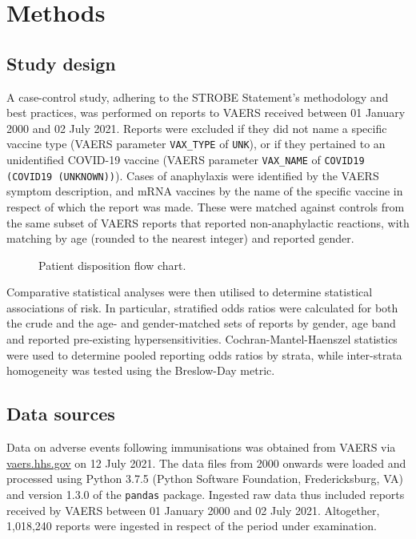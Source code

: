 \documentclass{article}
\begin{document}
\section{Methods}

\subsection{Study design}

A case-control study, adhering to the STROBE Statement's methodology and best practices,\cite{von2014strengthening} was performed on reports to VAERS received between 01 January 2000 and 02 July 2021.
Reports were excluded if they did not name a specific vaccine type (VAERS parameter \texttt{VAX\_TYPE} of \texttt{UNK}), or if they pertained to an unidentified COVID-19 vaccine (VAERS parameter \texttt{VAX\_NAME} of \texttt{COVID19 (COVID19 (UNKNOWN))}).
Cases of anaphylaxis were identified by the VAERS symptom description, and mRNA vaccines by the name of the specific vaccine in respect of which the report was made.
These were matched against controls from the same subset of VAERS reports that reported non-anaphylactic reactions, with matching by age (rounded to the nearest integer) and reported gender.

\begin{figure}
    \centering
    
    \caption{Patient disposition flow chart.}
    \label{fig:patient_disposition}
\end{figure}

Comparative statistical analyses were then utilised to determine statistical associations of risk.
In particular, stratified odds ratios were calculated for both the crude and the age- and gender-matched sets of reports by gender, age band and reported pre-existing hypersensitivities.
Cochran-Mantel-Haenszel statistics were used to determine pooled reporting odds ratios by strata, while inter-strata homogeneity was tested using the Breslow-Day metric.

\subsection{Data sources}

Data on adverse events following immunisations was obtained from VAERS via \url{vaers.hhs.gov} on 12 July 2021.
The data files from 2000 onwards were loaded and processed using Python 3.7.5 (Python Software Foundation, Fredericksburg, VA) and version 1.3.0 of the \texttt{pandas} package.\cite{mckinney2011pandas}
Ingested raw data thus included reports received by VAERS between 01 January 2000 and 02 July 2021.
Altogether, 1,018,240 reports were ingested in respect of the period under examination.
\end{document}
